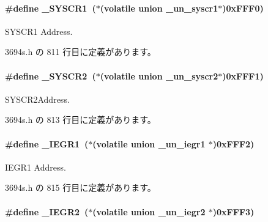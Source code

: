 \paragraph[{\+\_\+\+S\+Y\+S\+C\+R1}]{\setlength{\rightskip}{0pt plus 5cm}\#define \+\_\+\+S\+Y\+S\+C\+R1~($\ast$(volatile union  {\bf \+\_\+un\+\_\+syscr1}$\ast$)0x\+F\+F\+F0)}\label{3694s_8h_aeafde033525d62a94985a411074cb114_aeafde033525d62a94985a411074cb114}


S\+Y\+S\+C\+R1 Address. 



 3694s.\+h の 811 行目に定義があります。

\paragraph[{\+\_\+\+S\+Y\+S\+C\+R2}]{\setlength{\rightskip}{0pt plus 5cm}\#define \+\_\+\+S\+Y\+S\+C\+R2~($\ast$(volatile union  {\bf \+\_\+un\+\_\+syscr2}$\ast$)0x\+F\+F\+F1)}\label{3694s_8h_ab887b3c1a50e47b4945ee50de1988cff_ab887b3c1a50e47b4945ee50de1988cff}


S\+Y\+S\+C\+R2\+Address. 



 3694s.\+h の 813 行目に定義があります。

\paragraph[{\+\_\+\+I\+E\+G\+R1}]{\setlength{\rightskip}{0pt plus 5cm}\#define \+\_\+\+I\+E\+G\+R1~($\ast$(volatile union  {\bf \+\_\+un\+\_\+iegr1} $\ast$)0x\+F\+F\+F2)}\label{3694s_8h_a799527df090b9d3512fce86b04206f7b_a799527df090b9d3512fce86b04206f7b}


I\+E\+G\+R1 Address. 



 3694s.\+h の 815 行目に定義があります。

\paragraph[{\+\_\+\+I\+E\+G\+R2}]{\setlength{\rightskip}{0pt plus 5cm}\#define \+\_\+\+I\+E\+G\+R2~($\ast$(volatile union  {\bf \+\_\+un\+\_\+iegr2} $\ast$)0x\+F\+F\+F3)}\label{3694s_8h_a1f4b45f7c5f5c531d190283bbb9ca33b_a1f4b45f7c5f5c531d190283bbb9ca33b}


